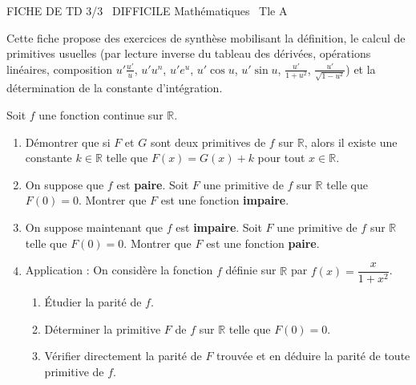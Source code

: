 \documentclass[11pt]{article}
\begin{document}
\begin{tcolorbox}[enhanced,colback=popink,colframe=popink,arc=10pt,boxrule=0pt,left=12pt,right=12pt,top=9pt,bottom=9pt]
{\color{white}\popxbold\small FICHE DE TD 3/3 \textbullet\ DIFFICILE \hfill Mathématiques \textbullet\ Tle A\par}
\end{tcolorbox}
\vspace{4pt}
Cette fiche propose des exercices de synthèse mobilisant la définition, le calcul de primitives usuelles (par lecture inverse du tableau des dérivées, opérations linéaires, composition $u' \frac{u'}{u}$, $u' u^n$, $u' e^u$, $u' \cos u$, $u' \sin u$, $\frac{u'}{1+u^2}$, $\frac{u'}{\sqrt{1-u^2}}$) et la détermination de la constante d'intégration.

\begin{exercice}
Soit $f$ une fonction continue sur $\mathbb{R}$.
\begin{enumerate}
    \item Démontrer que si $F$ et $G$ sont deux primitives de $f$ sur $\mathbb{R}$, alors il existe une constante $k \in \mathbb{R}$ telle que $F(x) = G(x) + k$ pour tout $x \in \mathbb{R}$.
    \item On suppose que $f$ est \textbf{paire}. Soit $F$ une primitive de $f$ sur $\mathbb{R}$ telle que $F(0) = 0$. Montrer que $F$ est une fonction \textbf{impaire}.
    \item On suppose maintenant que $f$ est \textbf{impaire}. Soit $F$ une primitive de $f$ sur $\mathbb{R}$ telle que $F(0) = 0$. Montrer que $F$ est une fonction \textbf{paire}.
    \item Application : On considère la fonction $f$ définie sur $\mathbb{R}$ par $f(x) = \dfrac{x}{1+x^2}$.
    \begin{enumerate}
        \item Étudier la parité de $f$.
        \item Déterminer la primitive $F$ de $f$ sur $\mathbb{R}$ telle que $F(0) = 0$.
        \item Vérifier directement la parité de $F$ trouvée et en déduire la parité de toute primitive de $f$.
    \end{enumerate}
\end{enumerate}
\end{exercice}
\end{document}

